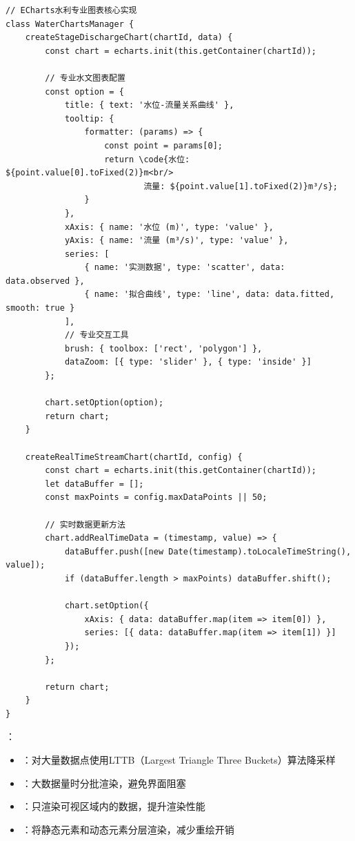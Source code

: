 \begin{lstlisting}[style=javascript]
// ECharts水利专业图表核心实现
class WaterChartsManager {
    createStageDischargeChart(chartId, data) {
        const chart = echarts.init(this.getContainer(chartId));
        
        // 专业水文图表配置
        const option = {
            title: { text: '水位-流量关系曲线' },
            tooltip: {
                formatter: (params) => {
                    const point = params[0];
                    return \code{水位: ${point.value[0].toFixed(2)}m<br/>
                            流量: ${point.value[1].toFixed(2)}m³/s};
                }
            },
            xAxis: { name: '水位 (m)', type: 'value' },
            yAxis: { name: '流量 (m³/s)', type: 'value' },
            series: [
                { name: '实测数据', type: 'scatter', data: data.observed },
                { name: '拟合曲线', type: 'line', data: data.fitted, smooth: true }
            ],
            // 专业交互工具
            brush: { toolbox: ['rect', 'polygon'] },
            dataZoom: [{ type: 'slider' }, { type: 'inside' }]
        };
        
        chart.setOption(option);
        return chart;
    }
    
    createRealTimeStreamChart(chartId, config) {
        const chart = echarts.init(this.getContainer(chartId));
        let dataBuffer = [];
        const maxPoints = config.maxDataPoints || 50;
        
        // 实时数据更新方法
        chart.addRealTimeData = (timestamp, value) => {
            dataBuffer.push([new Date(timestamp).toLocaleTimeString(), value]);
            if (dataBuffer.length > maxPoints) dataBuffer.shift();
            
            chart.setOption({
                xAxis: { data: dataBuffer.map(item => item[0]) },
                series: [{ data: dataBuffer.map(item => item[1]) }]
            });
        };
        
        return chart;
    }
}
\end{lstlisting}

：

\begin{itemize}
\tightlist
\item
  ：对大量数据点使用LTTB（Largest Triangle Three Buckets）算法降采样
\item
  ：大数据量时分批渲染，避免界面阻塞
\item
  ：只渲染可视区域内的数据，提升渲染性能
\item
  ：将静态元素和动态元素分层渲染，减少重绘开销
\end{itemize}

